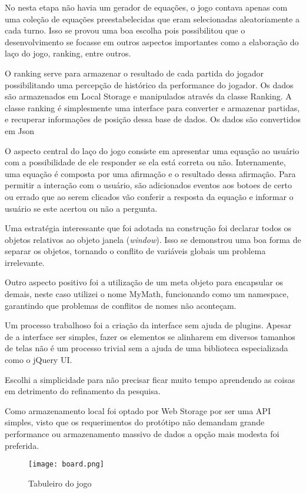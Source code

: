 \begin{draft}
No nesta etapa não havia um gerador de equações, o jogo
contava apenas com uma coleção de equações preestabelecidas que eram
selecionadas aleatoriamente a cada turno. Isso se provou uma boa escolha
pois possibilitou que o desenvolvimento se focasse em outros aspectos
importantes como a elaboração do laço do jogo, ranking, entre outros.

O ranking serve para armazenar o resultado de cada partida do jogador
possibilitando uma percepção de histórico da performance do jogador.
Os dados são armazenados em Local Storage e manipulados através da
classe Ranking. A classe ranking é simplesmente uma interface para
converter e armazenar partidas, e recuperar informações de posição
dessa base de dados. Os dados são convertidos em Json

O aspecto central do laço do jogo consiste em apresentar uma equação
ao usuário com a possibilidade de ele responder se ela está correta ou
não. Internamente, uma equação é composta por uma afirmação e o
resultado dessa afirmação. Para permitir a interação com o usuário,
são adicionados eventos aos botoes de certo ou errado que ao serem
clicados vão conferir a resposta da equação e informar o usuário se
este acertou ou não a pergunta.

Uma estratégia interessante que foi adotada na construção foi
declarar todos os objetos relativos ao objeto janela (\textit{window}).
Isso se demonstrou uma boa forma de separar os objetos, tornando o
conflito de variáveis globais um problema irrelevante.

Outro aspecto positivo foi a utilização de um meta objeto para
encapsular os demais, neste caso utilizei o nome MyMath, funcionando
como um namespace, garantindo que problemas de conflitos de nomes não
aconteçam.

Um processo trabalhoso foi a criação da interface sem ajuda de plugins.
Apesar de a interface ser simples, fazer os elementos se alinharem em 
diversos tamanhos de telas não é um processo trivial sem a ajuda de uma
biblioteca especializada como o jQuery UI.

Escolhi a simplicidade para não precisar ficar muito tempo aprendendo
as coisas em detrimento do refinamento da pesquisa.

Como armazenamento local foi optado por Web Storage por ser uma API simples,
visto que os requerimentos do protótipo não demandam grande performance ou
armazenamento massivo de dados a opção mais modesta foi preferida.

\end{draft}
\begin{figure}
    \centering
    \texttt{[image: board.png]}
	\caption{Tabuleiro do jogo}
\end{figure}


